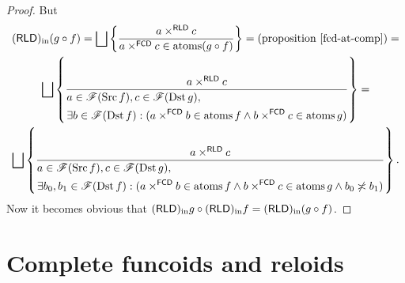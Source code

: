 \begin{proof}
But 
\begin{multline*}
\torldin(g\circ f)=
\bigsqcup\setcond{a\times^{\mathsf{RLD}}c}{a\times^{\mathsf{FCD}}c\in\atoms(g\circ f)}=\text{(proposition~\ref{fcd-at-comp})}=\\
\bigsqcup\setcond{a\times^{\mathsf{RLD}}c}{
\begin{aligned}
&a\in\mathscr{F}(\Src f),c\in\mathscr{F}(\Dst g),\\
&\exists b\in\mathscr{F}(\Dst f):(a\times^{\mathsf{FCD}}b\in\atoms f\land b\times^{\mathsf{FCD}}c\in\atoms g)
\end{aligned}
}=\\
\bigsqcup\setcond{a\times^{\mathsf{RLD}}c}{
\begin{aligned}
&a\in\mathscr{F}(\Src f),c\in\mathscr{F}(\Dst g),\\
&\exists b_0,b_1\in\mathscr{F}(\Dst f):(a\times^{\mathsf{FCD}}b\in\atoms f\land b\times^{\mathsf{FCD}}c\in\atoms g\land b_0\nasymp b_1)
\end{aligned}
}.
\end{multline*}
Now it becomes obvious that $(\mathsf{RLD})_{\mathrm{in}} g\circ(\mathsf{RLD})_{\mathrm{in}} f=(\mathsf{RLD})_{\mathrm{in}}(g\circ f)$.
\end{proof}

\section{Complete funcoids and reloids}

